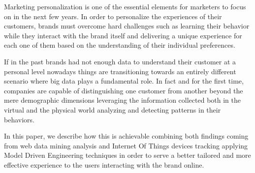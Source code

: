 \renewcommand{\sfdefault}{phv}

Marketing personalization is one of the essential elements for marketers to focus on in the next few years. In order to personalize the experiences of their customers, brands must overcome hard challenges such as learning their behavior while they interact with the brand itself and delivering a unique experience for each one of them based on the understanding of their individual preferences.

If in the past brands had not enough data to understand their customer at a personal level nowadays things are transitioning towards an entirely different scenario where big data plays a fundamental role. In fact and for the first time, companies are capable of distinguishing one customer from another beyond the mere demographic dimensions leveraging the information collected both in the virtual and the physical world analyzing and detecting patterns in their behaviors.

In this paper, we describe how this is achievable combining both findings coming from web data mining analysis and Internet Of Things devices tracking applying Model Driven Engineering techniques in order to serve a better tailored and more effective experience to the users interacting with the brand online.